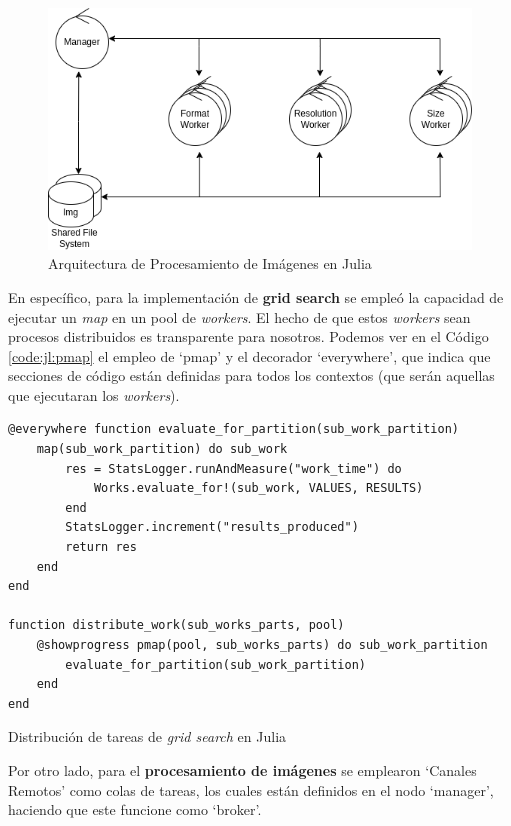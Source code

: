 \documentclass[11pt]{article}
\begin{document}
\begin{figure}[ht]
    \centering
    \includegraphics[scale=0.4]{resources/distributed_systems/jl/image_processing_arch.png}
    \caption{Arquitectura de Procesamiento de Imágenes en Julia}
    \label{fig:jl:image_processing_arch}
\end{figure}

En específico, para la implementación de \textbf{grid search} se empleó la capacidad de ejecutar un \textit{map} en un pool de \textit{workers}. El hecho de que estos \textit{workers} sean procesos distribuidos es transparente  para nosotros. Podemos ver en el Código \ref{code:jl:pmap} el empleo de `pmap' y el decorador `everywhere', que indica que secciones de código están definidas para todos los contextos (que serán aquellas que ejecutaran los \textit{workers}).

\begin{listing}[ht]
\begin{verbatim}
@everywhere function evaluate_for_partition(sub_work_partition)
    map(sub_work_partition) do sub_work
        res = StatsLogger.runAndMeasure("work_time") do
            Works.evaluate_for!(sub_work, VALUES, RESULTS)
        end
        StatsLogger.increment("results_produced")
        return res
    end
end

function distribute_work(sub_works_parts, pool)
    @showprogress pmap(pool, sub_works_parts) do sub_work_partition
        evaluate_for_partition(sub_work_partition)
    end
end
\end{verbatim}
\caption{Distribución de tareas de \textit{grid search} en Julia}
\label{code:jl:pmap}
\end{listing}

Por otro lado, para el \textbf{procesamiento de imágenes} se emplearon `Canales Remotos' como colas de tareas, los cuales están definidos en el nodo `manager', haciendo que este funcione como `broker'.
\end{document}
